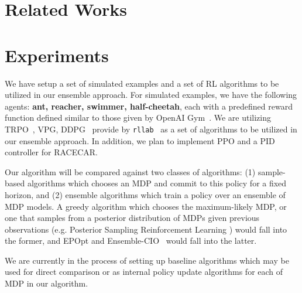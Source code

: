 \documentclass{article}
\begin{document}
\section{Related Works}

\newpage


\section{Experiments}

We have setup a set of simulated examples and a set of RL algorithms to be utilized in our ensemble approach. For simulated examples, we have the following agents: \textbf{ant, reacher, swimmer, half-cheetah}, each with a predefined reward function defined similar to those given by OpenAI Gym~\cite{openai}. We are utilizing TRPO~\cite{trpo}, VPG, DDPG~\cite{ddpg} provide by \texttt{rllab}~\cite{duan2016benchmarking} as a set of algorithms to be utilized in our ensemble approach. In addition, we plan to implement PPO and a PID controller for RACECAR.

Our algorithm will be compared against two classes of algorithms: (1) sample-based algorithms which chooses an MDP and commit to this policy for a fixed horizon, and (2) ensemble algorithms which train a policy over an ensemble of MDP models. A greedy algorithm which chooses the maximum-likely MDP, or one that samples from a posterior distribution of MDPs given previous observations (e.g. Posterior Sampling Reinforcement Learning \cite{psrl}) would fall into the former, and EPOpt\cite{rajeswaran2016epopt} and Ensemble-CIO~\cite{ensemble-cio} would fall into the latter.

We are currently in the process of setting up baseline algorithms which may be used for direct comparison or as internal policy update algorithms for each of MDP in our algorithm.
\end{document}
